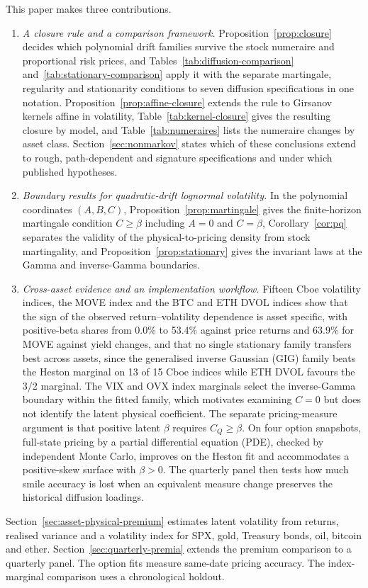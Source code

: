 \documentclass[11pt,a4paper]{article}
\theoremstyle{definition}
\theoremstyle{remark}
\newcommand{\betaPosVIX}{0.0}
\newcommand{\betaPosMOVE}{63.9}
\newcommand{\betaPosGVZ}{53.4}
\newcommand{\panelCount}{15}
\newcommand{\panelGigWins}{13}
\begin{document}
This paper makes three contributions.
\begin{enumerate}
\item \emph{A closure rule and a comparison framework.} Proposition~\ref{prop:closure} decides which polynomial drift families survive the stock numeraire and proportional risk prices, and Tables~\ref{tab:diffusion-comparison} and~\ref{tab:stationary-comparison} apply it with the separate martingale, regularity and stationarity conditions to seven diffusion specifications in one notation. Proposition~\ref{prop:affine-closure} extends the rule to Girsanov kernels affine in volatility, Table~\ref{tab:kernel-closure} gives the resulting closure by model, and Table~\ref{tab:numeraires} lists the numeraire changes by asset class. Section~\ref{sec:nonmarkov} states which of these conclusions extend to rough, path-dependent and signature specifications and under which published hypotheses.
\item \emph{Boundary results for quadratic-drift lognormal volatility.} In the polynomial coordinates $(A,B,C)$, Proposition~\ref{prop:martingale} gives the finite-horizon martingale condition $C\geq\beta$ including $A=0$ and $C=\beta$, Corollary~\ref{cor:pq} separates the validity of the physical-to-pricing density from stock martingality, and Proposition~\ref{prop:stationary} gives the invariant laws at the Gamma and inverse-Gamma boundaries.
\item \emph{Cross-asset evidence and an implementation workflow.} Fifteen Cboe volatility indices, the MOVE index and the BTC and ETH DVOL indices show that the sign of the observed return--volatility dependence is asset specific, with positive-beta shares from \betaPosVIX\% to \betaPosGVZ\% against price returns and \betaPosMOVE\% for MOVE against yield changes, and that no single stationary family transfers best across assets, since the generalised inverse Gaussian (GIG) family beats the Heston marginal on \panelGigWins{} of \panelCount{} Cboe indices while ETH DVOL favours the 3/2 marginal. The VIX and OVX index marginals select the inverse-Gamma boundary within the fitted family, which motivates examining $C=0$ but does not identify the latent physical coefficient. The separate pricing-measure argument is that positive latent $\beta$ requires $C_Q\geq\beta$. On four option snapshots, full-state pricing by a partial differential equation (PDE), checked by independent Monte Carlo, improves on the Heston fit and accommodates a positive-skew surface with $\beta>0$. The quarterly panel then tests how much smile accuracy is lost when an equivalent measure change preserves the historical diffusion loadings.
\end{enumerate}
Section~\ref{sec:asset-physical-premium} estimates latent volatility from returns, realised variance and a volatility index for SPX, gold, Treasury bonds, oil, bitcoin and ether. Section~\ref{sec:quarterly-premia} extends the premium comparison to a quarterly panel. The option fits measure same-date pricing accuracy. The index-marginal comparison uses a chronological holdout.
\end{document}
